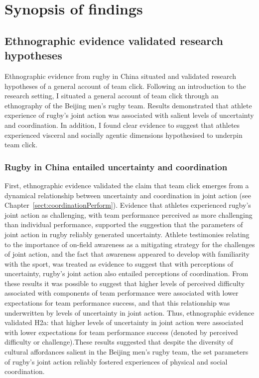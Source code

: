 
\section{Synopsis of findings}

\subsection{Ethnographic evidence validated research hypotheses}
Ethnographic evidence from rugby in China situated and validated research hypotheses of a general account of team click.  Following an introduction to the research setting, I situated a general account of team click through an ethnography of the Beijing men's rugby team.   Results demonstrated that athlete experience of rugby's joint action was associated with salient levels of uncertainty and coordination.  In addition, I found clear evidence to suggest that athletes experienced visceral and socially agentic dimensions hypothesised to underpin team click.

\subsubsection{Rugby in China entailed uncertainty and coordination}
First, ethnographic evidence validated the claim that team click emerges from a dynamical relationship between uncertainty and coordination in joint action (see Chapter~\ref{sect:coordinationPerform}).  Evidence
that athletes experienced rugby's joint action as challenging, with team performance perceived as more challenging than individual performance, supported the suggestion that the parameters of joint action in rugby reliably generated uncertainty. Athlete testimonies relating to the importance of on-field awareness as a mitigating strategy for the challenges of joint action, and the fact that awareness appeared to develop with familiarity with the sport, was treated as evidence to suggest that with perceptions of uncertainty, rugby's joint action also entailed perceptions of coordination.  From these results it was possible to suggest that higher levels of perceived difficulty associated with components of team performance were associated with lower expectations for team performance success, and that this relationship was underwritten by levels of uncertainty in joint action.  Thus, ethnographic evidence validated H2a: that higher levels of uncertainty in joint action were associated with lower expectations for team performance success (denoted by perceived difficulty or challenge).These results suggested that despite the diversity of cultural affordances salient in the Beijing men's rugby team, the set parameters of rugby's joint action reliably fostered experiences of physical and social coordination.

